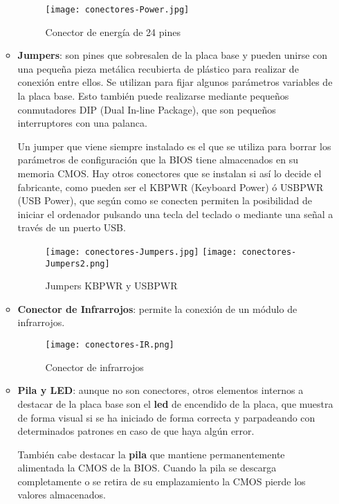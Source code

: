 \begin{itemize}
\begin{itemize}
    \begin{figure}[H]
        \centering
        \texttt{[image: conectores-Power.jpg]}
        \caption{Conector de energía de 24 pines}
    \end{figure}

    \item \textbf{Jumpers}: son pines que sobresalen de la placa base y pueden unirse con una pequeña pieza metálica recubierta de plástico para realizar de conexión entre ellos. Se utilizan para fijar algunos parámetros variables de la placa base. Esto también puede realizarse mediante pequeños conmutadores DIP (Dual In-line Package), que son pequeños interruptores con una palanca.

    Un jumper que viene siempre instalado es el que se utiliza para borrar los parámetros de configuración que la BIOS tiene almacenados en su memoria CMOS. Hay otros conectores que se instalan si así lo decide el fabricante, como pueden ser el KBPWR (Keyboard Power) ó USBPWR (USB Power), que según como se conecten permiten la posibilidad de iniciar el ordenador pulsando una tecla del teclado o mediante una señal a través de un puerto USB.

      \begin{figure}[H]
        \centering
        \texttt{[image: conectores-Jumpers.jpg]}  \hspace{2ex} \texttt{[image: conectores-Jumpers2.png]}
        \caption{Jumpers KBPWR y USBPWR}
    \end{figure}

    \item \textbf{Conector de Infrarrojos}: permite la conexión de un módulo de infrarrojos.

    \begin{figure}[H]
        \centering
        \texttt{[image: conectores-IR.png]}
        \caption{Conector de infrarrojos}
    \end{figure}

     \item \textbf{Pila y LED}: aunque no son conectores, otros elementos internos a destacar de la placa base son el \textbf{led} de encendido de la placa, que muestra de forma visual si se ha iniciado de forma correcta y parpadeando con determinados patrones en caso de que haya algún error.

     También cabe destacar la \textbf{pila} que mantiene permanentemente alimentada la CMOS de la BIOS. Cuando la pila se descarga completamente o se retira de su emplazamiento la CMOS pierde los valores almacenados.


\end{itemize}
\end{itemize}
